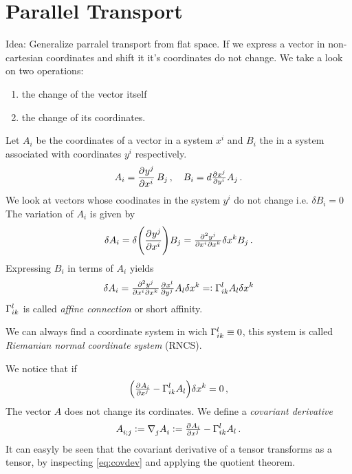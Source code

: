 \section{Parallel Transport}
Idea: Generalize parralel transport from flat space.
If we express a vector in non-cartesian coordinates and shift it it's
coordinates do not change.
We take a look on two operations:
\begin{enumerate}
\item the change of the vector itself
\item the change of its coordinates.
\end{enumerate}
Let $A_i$ be the coordinates of a vector in a system $x^i$ and $B_i$ the in a
system associated with coordinates $y^i$ respectively.
\begin{equation}
A_i=\dpd{{y^j}}{{x^i}}B_j\, ,\quad B_i=d\pd{{x^j}}{{y^i}}A_j\, .
\end{equation}
We look at vectors whose coodinates in the system $y^i$ do not change i.e.
$\delta B_i=0$ The variation of $A_i$ is given by
\begin{equation}
\delta
A_i=\delta\left(\dpd{{y^j}}{{x^i}}\right)B_j
=\md{{y^j}}{2}{{x^i}}{}{{x^k}}{}\delta
x^k B_j\, .
\end{equation}
Expressing $B_i$ in terms of $A_i$ yields
\begin{equation}
\delta A_i = \md{{y^j}}{2}{{x^i}}{}{{x^k}}{}\pd{{x^l}}{{y^j}}A_l\delta x^k
=:\affin{l}{i}{k}A_l\delta x^k
\end{equation}
$\Gamma^{l}_{i k}$ is called \emph{affine connection} or short affinity.
\begin{remark}
We can always find a coordinate system in wich $\Gamma^{l}_{i k}\equiv 0$, this
system is called \emph{Riemanian normal coordinate system} (RNCS).
\end{remark}
We notice that if 
\begin{equation}
\left(\pd{{A_i}}{{x^j}}-\affin{l}{i}{k}A_l\right)\delta x^k = 0\,
,\label{eq:covdev}
\end{equation}
The vector $A$ does not change its cordinates. We define a \emph{covariant
derivative} 
\begin{equation}
\tensor{A}{_i_;_j}:=\tensor{\nabla}{_j}\tensor{A}{_i}:=\pd{{A_i}}{{x^j}}-\affin{l}{i}{k}A_l\,
.
\end{equation}
It can easyly be seen that the covariant derivative of a tensor transforms as a
tensor, by inspecting \eqref{eq:covdev} and applying the quotient theorem.

